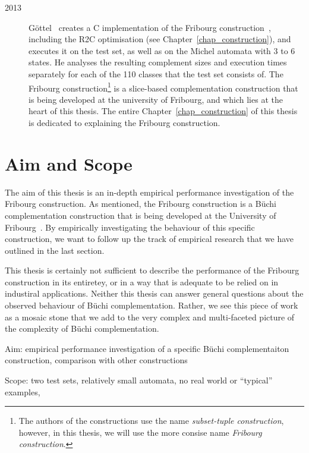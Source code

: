\begin{description}
\item[2013] Göttel~\cite{2013_bsc_goettel} creates a C implementation of the Fribourg construction~\cite{2014_joel_ulrich}, including the R2C optimisation (see Chapter~\ref{chap_construction}), and executes it on the \goal{} test set, as well as on the Michel automata with 3 to 6 states. He analyses the resulting complement sizes and execution times separately for each of the 110 classes that the \goal{} test set consists of. The Fribourg construction\footnote{The authors of the constructions use the name \textit{subset-tuple construction}, however, in this thesis, we will use the more consise name \textit{Fribourg construction}.} is a slice-based complementation construction that is being developed at the university of Fribourg, and which lies at the heart of this thesis. The entire Chapter~\ref{chap_construction} of this thesis is dedicated to explaining the Fribourg construction.
\end{description}


\section{Aim and Scope}
The aim of this thesis is an in-depth empirical performance investigation of the Fribourg construction. As mentioned, the Fribourg construction is a Büchi complementation construction that is being developed at the University of Fribourg~\cite{2014_joel_ulrich}. By empirically investigating the behaviour of this specific construction, we want to follow up the track of empirical research that we have outlined in the last section.

This thesis is certainly not sufficient to describe the performance of the Fribourg construction in its entiretey, or in a way that is adequate to be relied on in industiral applications. Neither this thesis can answer general questions about the observed behaviour of Büchi complementation. Rather, we see this piece of work as a mosaic stone that we add to the very complex and multi-faceted picture of the complexity of Büchi complementation.




Aim: empirical performance investigation of a specific Büchi complementaiton construction, comparison with other constructions

Scope: two test sets, relatively small automata, no real world or ``typical'' examples,



